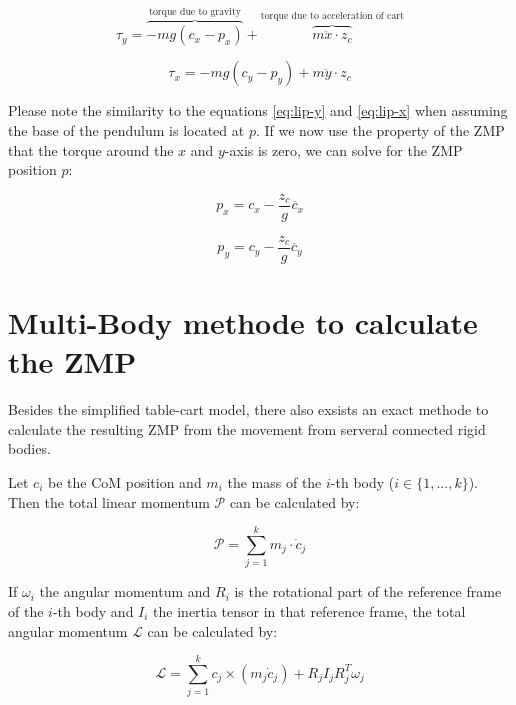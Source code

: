 \documentclass[english,ngerman]{KITreprt}
\begin{document}
\begin{equation}
\tau_y = \overbrace{-m g (c_x - p_x)}^{\text{torque due to gravity}} + \overbrace{m \ddot{x} \cdot z_c}^{\text{torque due to acceleration of cart}}
\end{equation}

\begin{equation}
\tau_x = -m g (c_y - p_y) + m \ddot{y} \cdot z_c
\end{equation}

Please note the similarity to the equations \ref{eq:lip-y} and
\ref{eq:lip-x} when assuming the base of the pendulum is located at $p$.
If we now use the property of the ZMP that the torque around the $x$ and
$y$-axis is zero, we can solve for the ZMP position $p$:

\begin{equation} \label{eq:zmp-x}
p_x = c_x - \frac{z_c}{g} \ddot{c_x}
\end{equation}

\begin{equation} \label{eq:zmp-y}
p_y = c_y - \frac{z_c}{g} \ddot{c_y}
\end{equation}

\section{Multi-Body methode to calculate the
ZMP}\label{section:multi-body-zmp}

Besides the simplified table-cart model, there also exsists an exact
methode to calculate the resulting ZMP from the movement from serveral
connected rigid bodies.

Let $c_i$ be the CoM position and $m_i$ the mass of the $i$-th body
($i \in \{1, ..., k\}$). Then the total linear momentum $\mathcal{P}$
can be calculated by:

\begin{equation}
\mathcal{P} = \sum^k_{j=1} m_j \cdot \dot{c}_j
\end{equation}

If $\omega_i$ the angular momentum and $R_i$ is the rotational part of
the reference frame of the $i$-th body and $I_i$ the inertia tensor in
that reference frame, the total angular momentum $\mathcal{L}$ can be
calculated by:

\begin{equation}
\mathcal{L} = \sum^k_{j=1} c_j \times (m_j \dot{c}_j) + R_j I_j R^T_j \omega_j
\end{equation}
\end{document}
